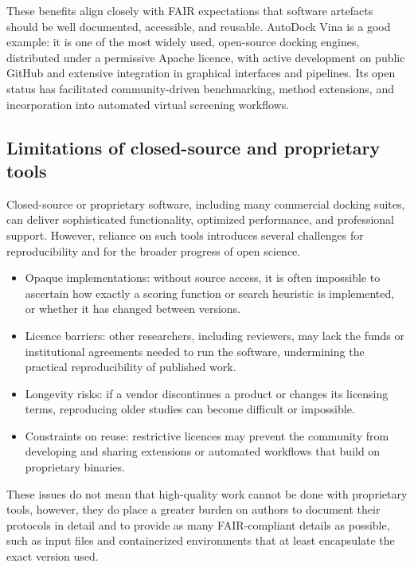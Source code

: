 \documentclass[12pt]{article}
\begin{document}
These benefits align closely with FAIR expectations that software artefacts should be well documented, accessible, and reusable.\cite{CH12_goFairPrinciples,CH12_tenCleanOSS,CH12_barba2022role} AutoDock Vina is a good example: it is one of the most widely used, open-source docking engines, distributed under a permissive Apache licence, with active development on public GitHub and extensive integration in graphical interfaces and pipelines.\cite{CH12_trott2010vina,CH12_autodockVinaGit} Its open status has facilitated community-driven benchmarking, method extensions, and incorporation into automated virtual screening workflows.

\subsection{Limitations of closed-source and proprietary tools}

Closed-source or proprietary software, including many commercial docking suites, can deliver sophisticated functionality, optimized performance, and professional support. However, reliance on such tools introduces several challenges for reproducibility and for the broader progress of open science.\cite{CH12_rigorRepro2020,CH12_barba2022role}

\begin{itemize}
  \item Opaque implementations: without source access, it is often impossible to ascertain how exactly a scoring function or search heuristic is implemented, or whether it has changed between versions.
  \item Licence barriers: other researchers, including reviewers, may lack the funds or institutional agreements needed to run the software, undermining the practical reproducibility of published work.
  \item Longevity risks: if a vendor discontinues a product or changes its licensing terms, reproducing older studies can become difficult or impossible.
  \item Constraints on reuse: restrictive licences may prevent the community from developing and sharing extensions or automated workflows that build on proprietary binaries.
\end{itemize}

These issues do not mean that high-quality work cannot be done with proprietary tools, however, they do place a greater burden on authors to document their protocols in detail and to provide as many FAIR-compliant details as possible, such as input files and containerized environments that at least encapsulate the exact version used.\cite{CH12_rigorRepro2020,CH12_computationalReproGuide}
\end{document}
